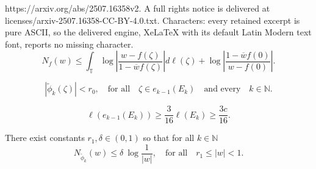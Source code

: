 \documentclass[10pt,a4paper]{amsart}
\newcommand{\N}{\mathbb{N}}
\newcommand{\T}{\mathbb{T}}
\renewcommand{\geq}{\geqslant}
\renewcommand{\leq}{\leqslant}
\begin{document}
https://arxiv.org/abs/2507.16358v2. A full rights notice is delivered at licenses/arxiv-2507.16358-CC-BY-4.0.txt. Characters: every retained excerpt is pure ASCII, so the delivered engine, XeLaTeX with its default Latin Modern text font, reports no missing character.
\begin{equation}\label{fatoulemma}
N_f(w) \leq \int_{\T}\log\left\lvert \frac{w-f(\zeta)}{1-\overline{w}f(\zeta)}\right\rvert d\ell(\zeta) + \log\left\lvert\frac{1-\overline{w}f(0)}{w-f(0)}\right\rvert.
\end{equation}

\begin{equation}
\left\lvert\widetilde{\phi}_k(\zeta)\right\rvert<r_0,\quad \text{for all}\quad \zeta\in e_{k-1}(E_k)\quad \text{and every}\quad k\in\N.\label{innerset}
\end{equation}

\begin{equation}\label{measure}
\ell\left(e_{k-1}(E_k)\right)\geq \frac{3}{16}\ell(E_k)\geq \frac{3c}{16}. 
\end{equation}

\begin{claim}\label{claim1}
There exist constants $r_1,\delta\in(0,1)$ so that for all $k\in\N$
\[
N_{\widetilde{\phi}_k}(w)\leq \delta\ \log\frac{1}{\lvert w \rvert}, \quad \text{for all} \quad r_1\leq \lvert w \rvert< 1.
\]
\end{claim}
\end{document}
